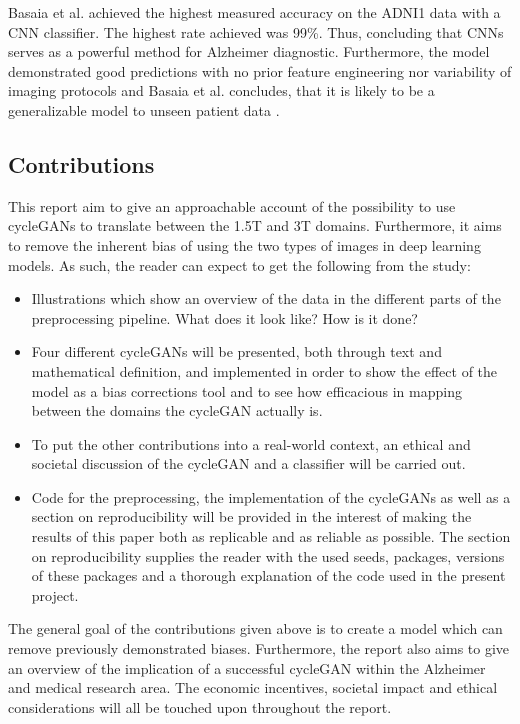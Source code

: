 \documentclass[12pt, fleqn, titlepage]{article}
\begin{document}
Basaia et al. achieved the highest measured accuracy on the ADNI1 data with a CNN classifier. The highest rate achieved was 99\%. Thus, concluding that CNNs serves as a powerful method for Alzheimer diagnostic. Furthermore, the model demonstrated good predictions with no prior feature engineering nor variability of imaging protocols and Basaia et al. concludes, that it is likely to be a generalizable model to unseen patient data \cite{neuro}. 

\subsection{Contributions}

This report aim to give an approachable account of the possibility to use cycleGANs to translate between the 1.5T and 3T domains. Furthermore, it aims to remove the inherent bias of using the two types of images in deep learning models. As such, the reader can expect to get the following from the study:

\begin{itemize}
	\item Illustrations which show an overview of the data in the different parts of the preprocessing pipeline. What does it look like? How is it done?

	\item Four different cycleGANs will be presented, both through text and mathematical definition, and implemented in order to show the effect of the model as a bias corrections tool and to see how efficacious in mapping between the domains the cycleGAN actually is.
	
	\item To put the other contributions into a real-world context, an ethical and societal discussion of the cycleGAN and a classifier will be carried out. 
	
	\item Code for the preprocessing, the implementation of the cycleGANs as well as a section on reproducibility will be provided in the interest of making the results of this paper both as replicable and as reliable as possible. The section on reproducibility supplies the reader with the used seeds, packages, versions of these packages and a thorough explanation of the code used in the present project.
\end{itemize}
\noindent
The general goal of the contributions given above is to create a model which can remove previously demonstrated biases. Furthermore, the report also aims to give an overview of the implication of a successful cycleGAN within the Alzheimer and medical research area. The economic incentives, societal impact and ethical considerations will all be touched upon throughout the report. 
\end{document}
